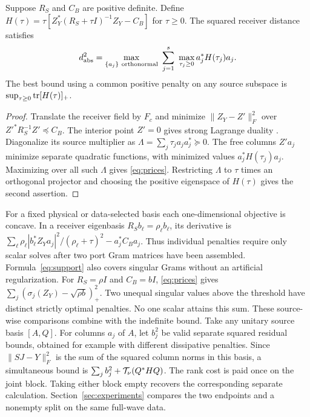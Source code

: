 \begin{proposition}\label{th:prices}
Suppose $R_S$ and $C_B$ are positive definite. Define
$H(\tau)=\tau[Z_Y^*(R_S+\tau I)^{-1}Z_Y-C_B]$ for $\tau\ge0$.
The squared receiver distance satisfies
\begin{equation}
 d_{\rm abs}^2=\max_{\{a_j\}\ {\rm orthonormal}}\ 
                    \sum_{j=1}^s\ \max_{\tau_j\ge0} a_j^*H(\tau_j)a_j .
 \label{eq:prices}
\end{equation}
The best bound using a common positive penalty on any source subspace is
$\sup_{\tau\ge0}\operatorname{tr}[H(\tau)]_+$.
\end{proposition}
\begin{proof}
Translate the receiver field by $F_c$ and minimize $\|Z_Y-Z'\|_F^2$ over $Z'^*R_S^{-1}Z'\preceq C_B$. The interior point $Z'=0$ gives strong Lagrange duality \cite{boyd}. Diagonalize its source multiplier as $\Lambda=\sum_j\tau_j a_ja_j^*\succeq0$. The free columns $Z'a_j$ minimize separate quadratic functions, with minimized values $a_j^*H(\tau_j)a_j$. Maximizing over all such $\Lambda$ gives \eqref{eq:prices}. Restricting $\Lambda$ to $\tau$ times an orthogonal projector and choosing the positive eigenspace of $H(\tau)$ gives the second assertion.
\end{proof}
For a fixed physical or data-selected basis each one-dimensional objective is concave. In a receiver eigenbasis $R_S b_\ell=\rho_\ell b_\ell$, its derivative is $\sum_\ell \rho_\ell|b_\ell^*Z_Ya_j|^2/(\rho_\ell+\tau)^2-a_j^*C_Ba_j$. Thus individual penalties require only scalar solves after two port Gram matrices have been assembled. Formula~\eqref{eq:support} also covers singular Grams without an artificial regularization. For $R_S=\rho I$ and $C_B=bI$, \eqref{eq:prices} gives $\sum_j(\sigma_j(Z_Y)-\sqrt{\rho b})_+^2$. Two unequal singular values above the threshold have distinct strictly optimal penalties. No one scalar attains this sum. These source-wise comparisons combine with the indefinite bound. Take any unitary source basis $[A,Q]$. For columns $a_j$ of $A$, let $b_j^2$ be valid separate squared residual bounds, obtained for example with different dissipative penalties. Since $\|SJ-Y\|_F^2$ is the sum of the squared column norms in this basis, a simultaneous bound is $\sum_j b_j^2+\mathcal T_{\nu}(Q^*HQ)$. The rank cost is paid once on the joint block. Taking either block empty recovers the corresponding separate calculation. Section~\ref{sec:experiments} compares the two endpoints and a nonempty split on the same full-wave data.
